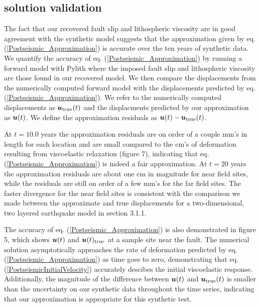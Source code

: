 \documentclass[extra]{gji}
\begin{document}
\subsection{solution validation}
The fact that our recovered fault slip and lithospheric viscosity are
in good agreement with the synthetic model suggests that the
approximation given by eq. (\ref{Postseismic_Approximation}) is
accurate over the ten years of synthetic data.  We quantify the
accuracy of eq. (\ref{Postseismic_Approximation}) by running a forward
model with Pylith where the imposed fault slip and lithospheric
viscosity are those found in our recovered model.  We then compare the
displacements from the numerically computed forward model with the
displacements predicted by eq. (\ref{Postseismic_Approximation}).  We
refer to the numerically computed displacements as
$\mitbf{u}_{\mathrm{true}}(t)$ and the displacments predicted by our
approximation as $\mitbf{u}(t)$.  We define the approximation residuals
as $\mitbf{u}(t) - \mitbf{u}_{\mathrm{true}}(t)$.

At $t=10.0$ years the approximation residuals are on order of a couple
mm's in length for each location and are small compared to the cm's of
deformation resulting from viscoelastic relaxation (figure 7),
indicating that eq. (\ref{Postseismic_Approximation}) is indeed a fair
approximation.  At $t=20$ years the approximation residuals are about
one cm in magnitude for near field sites, while the residuals are
still on order of a few mm's for the far field sites.  The faster
divergence for the near field sites is consistent with the comparison
we made between the approximate and true displacements for a
two-dimensional, two layered earthquake model in section 3.1.1.

The accuracy of eq. (\ref{Postseismic_Approximation}) is also
demonstrated in figure 5, which shows $\mitbf{u}(t)$ and
$\mitbf{u}(t)_{\mathrm{true}}$ at a sample site near the fault.  The
numerical solution asymptotically approaches the rate of deformation
predicted by eq. (\ref{Postseismic_Approximation}) as time goes to
zero, demonstrating that eq. (\ref{PostseismicInitialVelocity})
accurately descibes the initial viscoelastic response.  Additionally,
the magnitude of the difference between $\mitbf{u}(t)$ and
$\mitbf{u}_{\mathrm{true}}(t)$ is smaller than the uncertainty on our synthetic
data throughout the time series, indicating that our approximation is
appropriate for this synthetic test.

\end{document}
